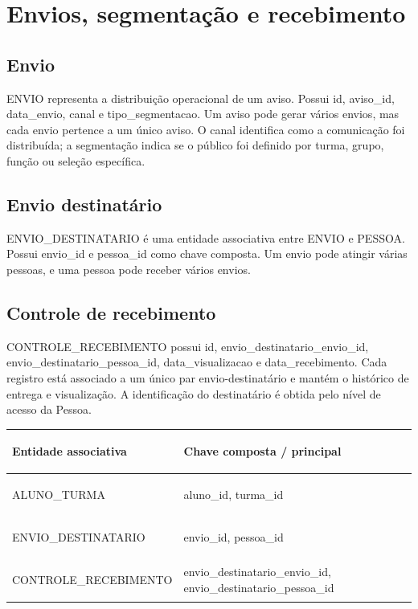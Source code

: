 \section{Envios, segmentação e recebimento}
\subsection{Envio}
ENVIO representa a distribuição operacional de um aviso. Possui id, aviso\_id, data\_envio, canal e tipo\_segmentacao. Um aviso pode gerar vários envios, mas cada envio pertence a um único aviso. O canal identifica como a comunicação foi distribuída; a segmentação indica se o público foi definido por turma, grupo, função ou seleção específica.

\subsection{Envio destinatário}
ENVIO\_DESTINATARIO é uma entidade associativa entre ENVIO e PESSOA. Possui envio\_id e pessoa\_id como chave composta. Um envio pode atingir várias pessoas, e uma pessoa pode receber vários envios.

\subsection{Controle de recebimento}
CONTROLE\_RECEBIMENTO possui id, envio\_destinatario\_envio\_id, envio\_destinatario\_pessoa\_id, data\_visualizacao e data\_recebimento. Cada registro está associado a um único par envio-destinatário e mantém o histórico de entrega e visualização. A identificação do destinatário é obtida pelo nível de acesso da Pessoa.

\begin{table}[!ht]\centering\small\renewcommand{\arraystretch}{1.4}
\begin{tabularx}{\linewidth}{|>{\bfseries\raggedright\arraybackslash}p{4cm}|>{\raggedright\arraybackslash}X|}
\hline
Entidade associativa & Chave composta / principal \\
\hline
ALUNO\_TURMA & aluno\_id, turma\_id \\
\hline
ENVIO\_DESTINATARIO & envio\_id, pessoa\_id \\
\hline
CONTROLE\_RECEBIMENTO & envio\_destinatario\_envio\_id, envio\_destinatario\_pessoa\_id \\
\hline
\end{tabularx}
\end{table}

